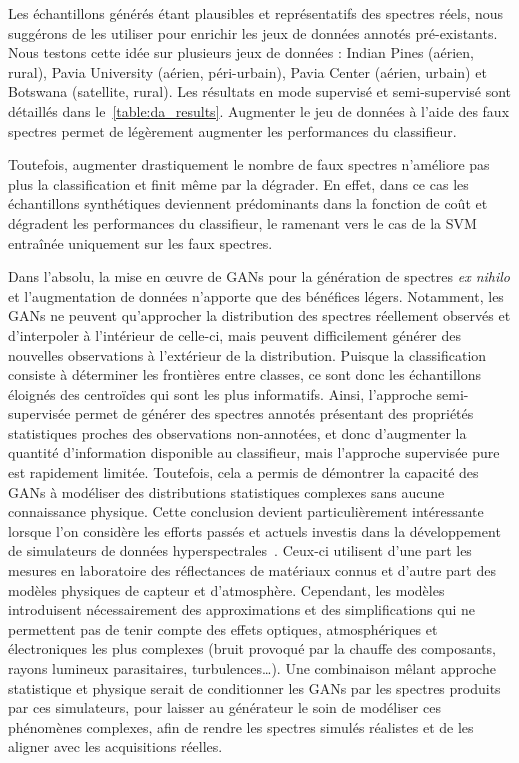 Les échantillons générés étant plausibles et représentatifs des spectres réels, nous suggérons de les utiliser pour enrichir les jeux de données annotés pré-existants. Nous testons cette idée sur plusieurs jeux de données : Indian Pines (aérien, rural), Pavia University (aérien, péri-urbain), Pavia Center (aérien, urbain) et Botswana (satellite, rural). Les résultats en mode supervisé et semi-supervisé sont détaillés dans le~\cref{table:da_results}. Augmenter le jeu de données à l'aide des faux spectres permet de légèrement augmenter les performances du classifieur.

Toutefois, augmenter drastiquement le nombre de faux spectres n'améliore pas plus la classification et finit même par la dégrader. En effet, dans ce cas les échantillons synthétiques deviennent prédominants dans la fonction de coût et dégradent les performances du classifieur, le ramenant vers le cas de la \gls{SVM} entraînée uniquement sur les faux spectres.

Dans l'absolu, la mise en \oe{}uvre de \glspl{GAN} pour la génération de spectres \emph{ex nihilo} et l'augmentation de données n'apporte que des bénéfices légers. Notamment, les \glspl{GAN} ne peuvent qu'approcher la distribution des spectres réellement observés et d'interpoler à l'intérieur de celle-ci, mais peuvent difficilement générer des nouvelles observations à l'extérieur de la distribution. Puisque la classification consiste à déterminer les frontières entre classes, ce sont donc les échantillons éloignés des centroïdes qui sont les plus informatifs. Ainsi, l'approche semi-supervisée permet de générer des spectres annotés présentant des propriétés statistiques proches des observations non-annotées, et donc d'augmenter la quantité d'information disponible au classifieur, mais l'approche supervisée pure est rapidement limitée. Toutefois, cela a permis de démontrer la capacité des \glspl{GAN} à modéliser des distributions statistiques complexes sans aucune connaissance physique. Cette conclusion devient particulièrement intéressante lorsque l'on considère les efforts passés et actuels investis dans la développement de simulateurs de données hyperspectrales~\cite{borner_sensor_2001}. Ceux-ci utilisent d'une part les mesures en laboratoire des réflectances de matériaux connus et d'autre part des modèles physiques de capteur et d'atmosphère. Cependant, les modèles introduisent nécessairement des approximations et des simplifications qui ne permettent pas de tenir compte des effets optiques, atmosphériques et électroniques les plus complexes (bruit provoqué par la chauffe des composants, rayons lumineux parasitaires, turbulences\dots). Une combinaison mêlant approche statistique et physique serait de conditionner les \glspl{GAN} par les spectres produits par ces simulateurs, pour laisser au générateur le soin de modéliser ces phénomènes complexes, afin de rendre les spectres simulés réalistes et de les aligner avec les acquisitions réelles.

